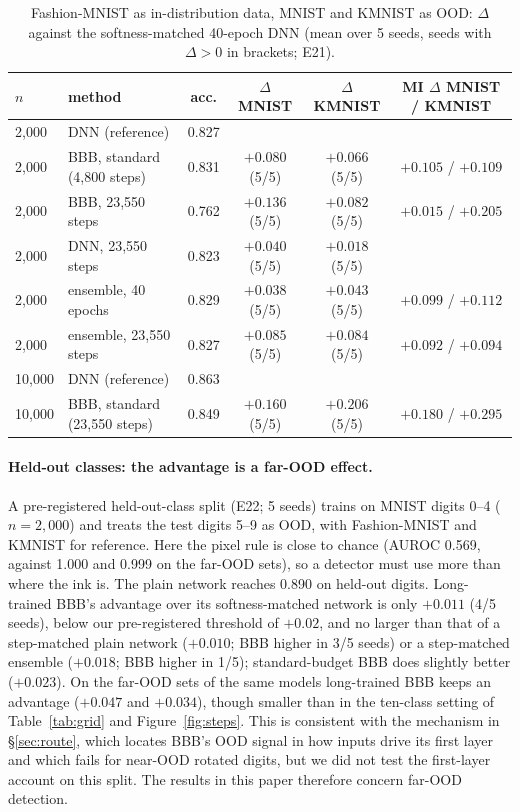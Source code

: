 \documentclass[10pt]{article}
\begin{document}
\begin{table}[!htb]
\centering\small
\caption{Fashion-MNIST as in-distribution data, MNIST and KMNIST as OOD:
$\Delta$ against the softness-matched 40-epoch DNN (mean over 5 seeds, seeds
with $\Delta>0$ in brackets; E21).}
\label{tab:fashion}
\begin{tabular}{llcccc}
\toprule
$n$ & method & acc. & $\Delta$ MNIST & $\Delta$ KMNIST & MI $\Delta$ MNIST / KMNIST \\
\midrule
2{,}000 & DNN (reference) & 0.827 & & & \\
2{,}000 & BBB, standard (4{,}800 steps) & 0.831 & $+0.080$ (5/5) & $+0.066$ (5/5) & $+0.105$ / $+0.109$ \\
2{,}000 & BBB, 23{,}550 steps & 0.762 & $+0.136$ (5/5) & $+0.082$ (5/5) & $+0.015$ / $+0.205$ \\
2{,}000 & DNN, 23{,}550 steps & 0.823 & $+0.040$ (5/5) & $+0.018$ (5/5) & \\
2{,}000 & ensemble, 40 epochs & 0.829 & $+0.038$ (5/5) & $+0.043$ (5/5) & $+0.099$ / $+0.112$ \\
2{,}000 & ensemble, 23{,}550 steps & 0.827 & $+0.085$ (5/5) & $+0.084$ (5/5) & $+0.092$ / $+0.094$ \\
\midrule
10{,}000 & DNN (reference) & 0.863 & & & \\
10{,}000 & BBB, standard (23{,}550 steps) & 0.849 & $+0.160$ (5/5) & $+0.206$ (5/5) & $+0.180$ / $+0.295$ \\
\bottomrule
\end{tabular}
\end{table}

\paragraph{Held-out classes: the advantage is a far-OOD effect.}\label{sec:near}
A pre-registered held-out-class split (E22; 5 seeds) trains on MNIST digits 0--4
($n=2{,}000$) and treats the test digits 5--9 as OOD, with Fashion-MNIST and
KMNIST for reference. Here the pixel rule is close to chance (AUROC 0.569,
against 1.000 and 0.999 on the far-OOD sets), so a detector must use more than
where the ink is. The plain network reaches 0.890 on held-out digits. Long-trained
BBB's advantage over its softness-matched network is only $+0.011$ (4/5 seeds),
below our pre-registered threshold of $+0.02$, and no larger than that of a
step-matched plain network ($+0.010$; BBB higher in 3/5 seeds) or a step-matched
ensemble ($+0.018$; BBB higher in 1/5); standard-budget BBB does slightly better
($+0.023$). On the far-OOD sets of the same models long-trained BBB keeps an
advantage ($+0.047$ and $+0.034$), though smaller than in the ten-class setting
of Table~\ref{tab:grid} and Figure~\ref{fig:steps}. This is consistent with the
mechanism in \S\ref{sec:route}, which locates BBB's OOD signal in how inputs
drive its first layer and which fails for near-OOD rotated digits, but we did
not test the first-layer account on this split. The results in this paper
therefore concern far-OOD detection.
\end{document}
